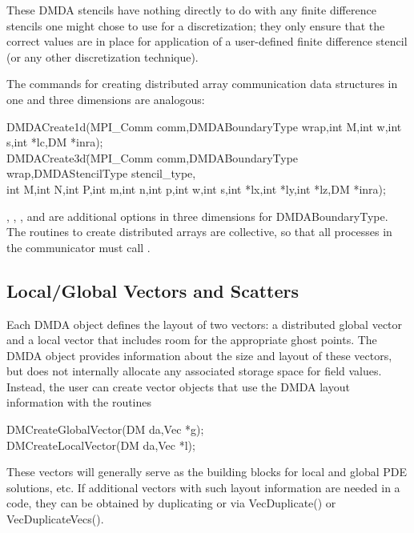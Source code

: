 These DMDA stencils have nothing directly to do with any finite
difference stencils one might chose to use for a discretization; they
only ensure that the correct values are in place for application of a
user-defined finite difference stencil (or any other
discretization technique).

The commands for creating distributed array communication data structures
in one and three dimensions are analogous:
\begin{tabbing}
  DMDACreate1d(MPI\_Comm comm,DMDABoundaryType wrap,int M,int w,int s,int *lc,DM *inra);\\
  DMDACreate3d\=(MPI\_Comm comm,DMDABoundaryType wrap,DMDAStencilType stencil\_type,\\
             \>int M,int N,int P,int m,int n,int p,int w,int s,int *lx,int *ly,int *lz,DM *inra);
\end{tabbing}
, 
, 
, and 
 
are additional options in three dimensions for DMDABoundaryType.
The routines to create distributed arrays are collective, so that all
processes in the communicator  must call .

\subsection{Local/Global Vectors and Scatters}

Each DMDA object defines the layout of two vectors: a distributed
global vector and a local vector that includes room for the
appropriate ghost points.  The DMDA object provides information
about the size and layout of these vectors, but does not internally
allocate any associated storage space for field values.  Instead, the
user can create vector objects that use the DMDA layout
information with the routines
\begin{tabbing}
  DMCreateGlobalVector(DM da,Vec *g);\\
  DMCreateLocalVector(DM da,Vec *l);
\end{tabbing}
These vectors will generally serve as the building blocks for local
and global PDE solutions, etc.  If additional vectors with such
layout information are needed in a code, they can be obtained by
duplicating  or  via
VecDuplicate() or VecDuplicateVecs().

